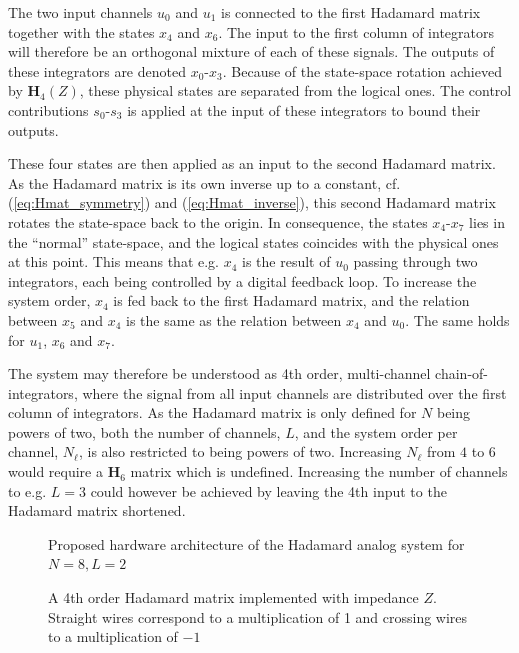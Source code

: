 The two input channels $u_0$ and $u_1$ is connected to the first Hadamard matrix together with the states $x_4$ and $x_6$. The input to the first column of integrators will therefore be an orthogonal mixture of each of these signals. The outputs of these integrators are denoted $x_0$-$x_3$. Because of the state-space rotation achieved by $\bm{H}_4(Z)$, these physical states are separated from the logical ones. The control contributions $s_0$-$s_3$ is applied at the input of these integrators to bound their outputs.

These four states are then applied as an input to the second Hadamard matrix. As the Hadamard matrix is its own inverse up to a constant, cf. (\ref{eq:Hmat_symmetry}) and (\ref{eq:Hmat_inverse}), this second Hadamard matrix rotates the state-space back to the origin. In consequence, the states $x_4$-$x_7$ lies in the \enquote{normal} state-space, and the logical states coincides with the physical ones at this point. This means that e.g. $x_4$ is the result of $u_0$ passing through two integrators, each being controlled by a digital feedback loop. To increase the system order, $x_4$ is fed back to the first Hadamard matrix, and the relation between $x_5$ and $x_4$ is the same as the relation between $x_4$ and $u_0$. The same holds for $u_1$, $x_6$ and $x_7$.

The system may therefore be understood as 4th order, multi-channel chain-of-integrators, where the signal from all input channels are distributed over the first column of integrators. As the Hadamard matrix is only defined for $N$ being powers of two, both the number of channels, $L$, and the system order per channel, $N_{\ell}$, is also restricted to being powers of two. Increasing $N_\ell$ from $4$ to $6$ would require a $\bm{H}_6$ matrix which is undefined. Increasing the number of channels to e.g. $L=3$ could however be achieved by leaving the 4th input to the Hadamard matrix shortened.

\begin{figure}
    \centering
    
    \caption{Proposed hardware architecture of the Hadamard analog system for $N=8, L=2$}
    \label{fig:HCI_AS_01}
\end{figure}

\begin{figure}[htbp]
    \centering
    
    \caption{A 4th order Hadamard matrix implemented with impedance $Z$. Straight wires correspond to a multiplication of 1 and crossing wires to a multiplication of $-1$}
    \label{fig:H4Z}
\end{figure}








